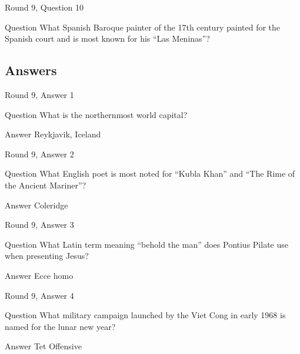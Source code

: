 \documentclass[11pt]{beamer}
\begin{document}
\begin{frame}{Round 9, Question 10}
\begin{block}{Question}
What Spanish Baroque painter of the 17th century painted for the Spanish court and is most known for his ``Las Meninas''\@?
\end{block}
\end{frame}
    
\subsection{Answers}

\begin{frame}{Round 9, Answer 1}
\begin{block}{Question}
What is the northernmost world capital\@?
\end{block}
\pause{}
\begin{block}{Answer}
Reykjavik, Iceland
\end{block}
\end{frame}
    

\begin{frame}{Round 9, Answer 2}
\begin{block}{Question}
What English poet is most noted for ``Kubla Khan'' and ``The Rime of the Ancient Mariner''\@?
\end{block}
\pause{}
\begin{block}{Answer}
Coleridge
\end{block}
\end{frame}
    

\begin{frame}{Round 9, Answer 3}
\begin{block}{Question}
What Latin term meaning ``behold the man'' does Pontius Pilate use when presenting Jesus\@?
\end{block}
\pause{}
\begin{block}{Answer}
Ecce homo
\end{block}
\end{frame}
    

\begin{frame}{Round 9, Answer 4}
\begin{block}{Question}
What military campaign launched by the Viet Cong in early 1968 is named for the lunar new year\@?
\end{block}
\pause{}
\begin{block}{Answer}
Tet Offensive
\end{block}
\end{frame}
    
\end{document}
